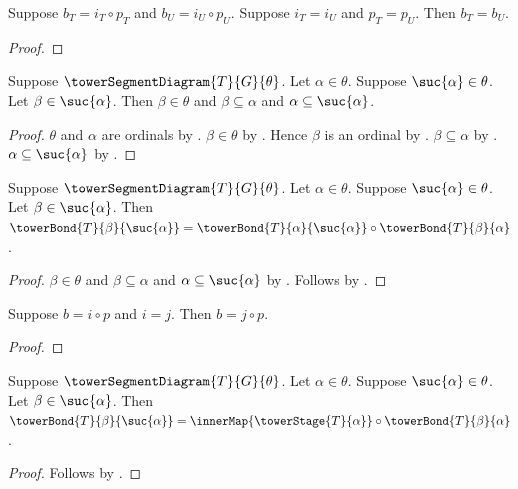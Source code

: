 \begin{proposition}\label{tower_bond_comparison_from_factors}
    Suppose $b_T=i_T\circ p_T$ and $b_U=i_U\circ p_U$.
    Suppose $i_T=i_U$ and $p_T=p_U$.
    Then $b_T=b_U$.
\end{proposition}
\begin{proof}
\end{proof}

\begin{proposition}\label{tower_successor_bond_context}
    Suppose $\towerSegmentDiagram{T}{G}{\theta}$.
    Let $\alpha\in\theta$.
    Suppose $\suc{\alpha}\in\theta$.
    Let $\beta\in\suc{\alpha}$.
    Then $\beta\in\theta$ and $\beta\subseteq\alpha$ and
        $\alpha\subseteq\suc{\alpha}$.
\end{proposition}
\begin{proof}
    $\theta$ and $\alpha$ are ordinals by
        .
    $\beta\in\theta$ by .
    Hence $\beta$ is an ordinal by
        .
    $\beta\subseteq\alpha$ by
        .
    $\alpha\subseteq\suc{\alpha}$ by
        .
\end{proof}

\begin{proposition}\label{tower_successor_bond_composition_law}
    Suppose $\towerSegmentDiagram{T}{G}{\theta}$.
    Let $\alpha\in\theta$.
    Suppose $\suc{\alpha}\in\theta$.
    Let $\beta\in\suc{\alpha}$.
    Then $\towerBond{T}{\beta}{\suc{\alpha}}=
        \towerBond{T}{\alpha}{\suc{\alpha}}\circ
            \towerBond{T}{\beta}{\alpha}$.
\end{proposition}
\begin{proof}
    $\beta\in\theta$ and $\beta\subseteq\alpha$ and
        $\alpha\subseteq\suc{\alpha}$ by
        .
    Follows by .
\end{proof}

\begin{proposition}\label{tower_right_composite_substitution}
    Suppose $b=i\circ p$ and $i=j$.
    Then $b=j\circ p$.
\end{proposition}
\begin{proof}
\end{proof}

\begin{proposition}\label{tower_successor_bond_factorization}
    Suppose $\towerSegmentDiagram{T}{G}{\theta}$.
    Let $\alpha\in\theta$.
    Suppose $\suc{\alpha}\in\theta$.
    Let $\beta\in\suc{\alpha}$.
    Then $\towerBond{T}{\beta}{\suc{\alpha}}=
        \innerMap{\towerStage{T}{\alpha}}\circ
            \towerBond{T}{\beta}{\alpha}$.
\end{proposition}
\begin{proof}
    Follows by
        .
\end{proof}

